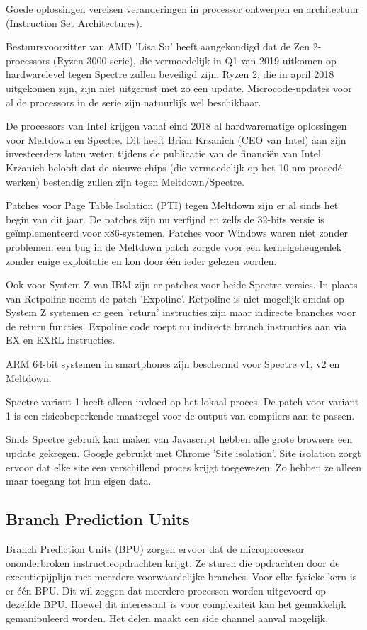 Goede oplossingen vereisen veranderingen in processor ontwerpen en architectuur (Instruction Set Architectures).

Bestuursvoorzitter van AMD 'Lisa Su' heeft aangekondigd dat de Zen 2-processors (Ryzen 3000-serie), die vermoedelijk in Q1 van 2019 uitkomen op hardwarelevel tegen Spectre zullen beveiligd zijn. Ryzen 2, die in april 2018 uitgekomen zijn, zijn niet uitgerust met zo een update. Microcode-updates voor al de processors in de serie zijn natuurlijk wel beschikbaar.

De processors van Intel krijgen vanaf eind 2018 al hardwarematige oplossingen voor Meltdown en Spectre.
Dit heeft Brian Krzanich (CEO van Intel) aan zijn investeerders laten weten tijdens de publicatie van de financiën van Intel. Krzanich belooft dat de nieuwe chips (die vermoedelijk op het 10 nm-procedé werken) bestendig zullen zijn tegen Meltdown/Spectre.

Patches voor Page Table Isolation (PTI) tegen Meltdown zijn er al sinds het begin van dit jaar. De patches zijn nu verfijnd en zelfs de 32-bits versie is geïmplementeerd voor x86-systemen.
Patches voor Windows waren niet zonder problemen: een bug in de Meltdown patch zorgde voor een kernelgeheugenlek zonder enige exploitatie en kon door één ieder gelezen worden.

Ook voor System Z van IBM zijn er patches voor beide Spectre versies.
In plaats van Retpoline noemt de patch 'Expoline'.
Retpoline is niet mogelijk omdat op System Z systemen er geen 'return' instructies zijn maar indirecte branches voor de return functies. Expoline code roept nu indirecte branch instructies aan via EX en EXRL instructies.

ARM 64-bit systemen in smartphones zijn beschermd voor Spectre v1, v2 en Meltdown.

Spectre variant 1 heeft alleen invloed op het lokaal proces.
De patch voor variant 1 is een risicobeperkende maatregel voor de output van compilers aan te passen.

Sinds Spectre gebruik kan maken van Javascript hebben alle grote browsers een update gekregen.
Google gebruikt met Chrome 'Site isolation'. Site isolation zorgt ervoor dat elke site een verschillend proces krijgt toegewezen. Zo hebben ze alleen maar toegang tot hun eigen data.

\subsection{Branch Prediction Units}
Branch Prediction Units (BPU) zorgen ervoor dat de microprocessor ononderbroken instructieopdrachten krijgt.
Ze sturen die opdrachten door de executiepijplijn met meerdere voorwaardelijke branches.
Voor elke fysieke kern is er één BPU.
Dit wil zeggen dat meerdere processen worden uitgevoerd op dezelfde BPU.
Hoewel dit interessant is voor complexiteit kan het gemakkelijk gemanipuleerd worden.
Het delen maakt een side channel aanval mogelijk.

